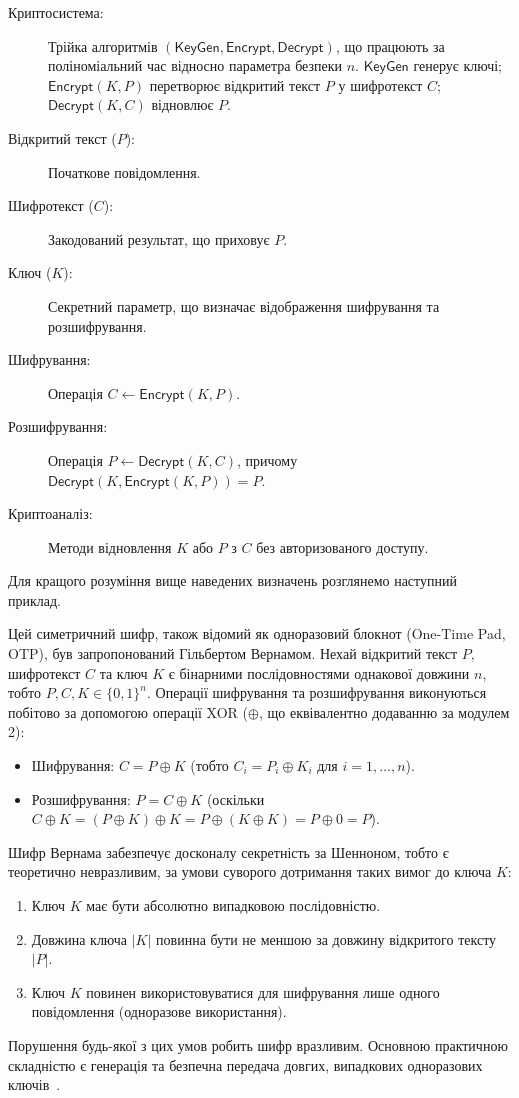 \begin{description}
    \item[Криптосистема:] Трійка алгоритмів \((\mathsf{KeyGen},\mathsf{Encrypt},\mathsf{Decrypt})\), що працюють за поліноміальний час відносно параметра безпеки \(n\).
    \(\mathsf{KeyGen}\) генерує ключі; \(\mathsf{Encrypt}(K,P)\) перетворює відкритий текст \(P\) у шифротекст \(C\); \(\mathsf{Decrypt}(K,C)\) відновлює \(P\).
    \item[Відкритий текст (\(P\)):] Початкове повідомлення.
    \item[Шифротекст (\(C\)):] Закодований результат, що приховує \(P\).
    \item[Ключ (\(K\)):] Секретний параметр, що визначає відображення шифрування та розшифрування.
    \item[Шифрування:] Операція \(C \leftarrow \mathsf{Encrypt}(K,P)\).
    \item[Розшифрування:] Операція \(P \leftarrow \mathsf{Decrypt}(K,C)\), причому \\ \(\mathsf{Decrypt}(K, \mathsf{Encrypt}(K,P)) = P\).
    \item[Криптоаналіз:] Методи відновлення \(K\) або \(P\) з \(C\) без авторизованого доступу.
\end{description}

Для кращого розуміння вище наведених визначень розглянемо наступний приклад.

\begin{example}
    \label{ex:otp_vernam}
    Цей симетричний шифр, також відомий як одноразовий блокнот (One-Time Pad, OTP), був запропонований Гільбертом Вернамом.
    Нехай відкритий текст \(P\), шифротекст \(C\) та ключ \(K\) є бінарними послідовностями однакової довжини \(n\), тобто \(P, C, K \in \{0, 1\}^n\).
    Операції шифрування та розшифрування виконуються побітово за допомогою операції XOR (\(\oplus\), що еквівалентно додаванню за модулем 2):
    \begin{itemize}
        \item Шифрування: \(C = P \oplus K\) (тобто \(C_i = P_i \oplus K_i\) для \(i=1, \dots, n\)).
        \item Розшифрування: \(P = C \oplus K\) (оскільки \(C \oplus K = (P \oplus K) \oplus K = P \oplus (K \oplus K) = P \oplus 0 = P\)).
    \end{itemize}
    Шифр Вернама забезпечує досконалу секретність за Шенноном, тобто є теоретично невразливим, за умови суворого дотримання таких вимог до ключа \(K\):
    \begin{enumerate}
        \item Ключ \(K\) має бути абсолютно випадковою послідовністю.
        \item Довжина ключа \(|K|\) повинна бути не меншою за довжину відкритого тексту \(|P|\).
        \item Ключ \(K\) повинен використовуватися для шифрування лише одного повідомлення (одноразове використання).
    \end{enumerate}
    Порушення будь-якої з цих умов робить шифр вразливим.
    Основною практичною складністю є генерація та безпечна передача довгих, випадкових одноразових ключів~\cite{8, VernamWiki}.
\end{example}

